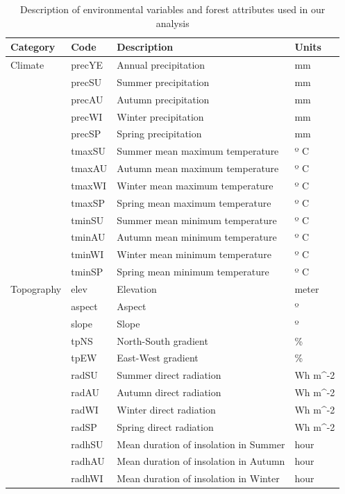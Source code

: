 \begin{table}[H]
\caption{Description of environmental variables and forest attributes used in our analysis}\label{tab:tvars}
\centering
\begingroup\fontsize{7}{9}\selectfont
\begin{tabular}{llll} 
\toprule
\textbf{Category} & \textbf{Code} & \textbf{Description} & \textbf{Units} \\ 
\midrule
\multirow{}{}{Climate} & precYE & Annual precipitation & mm \\
 & precSU & Summer precipitation & mm \\
 & precAU & Autumn precipitation & mm \\
 & precWI & Winter precipitation & mm \\
 & precSP & Spring precipitation & mm \\
 & tmaxSU & Summer mean maximum temperature & º C \\
 & tmaxAU & Autumn mean maximum temperature & º C \\
 & tmaxWI & Winter mean maximum temperature & º C \\
 & tmaxSP & Spring mean maximum temperature & º C \\
 & tminSU & Summer mean minimum temperature & º C \\
 & tminAU & Autumn mean minimum temperature & º C \\
 & tminWI & Winter mean minimum temperature & º C \\
 & tminSP & Spring mean minimum temperature & º C \\ 
\hline
\multirow{}{}{Topography} & elev & Elevation & meter \\
 & aspect & Aspect & º \\
 & slope & Slope & º \\
 & tpNS & North-South gradient & \% \\
 & tpEW & East-West gradient & \% \\ 
 & radSU & Summer direct radiation & Wh m^{-2} \\
 & radAU & Autumn direct radiation & Wh m^{-2} \\
 & radWI & Winter direct radiation & Wh m^{-2} \\
 & radSP & Spring direct radiation & Wh m^{-2} \\
 & radhSU & Mean duration of insolation in Summer & hour \\
 & radhAU & Mean duration of insolation in Autumn & hour \\
 & radhWI & Mean duration of insolation in Winter & hour \\

\end{tabular}
\end{table}
